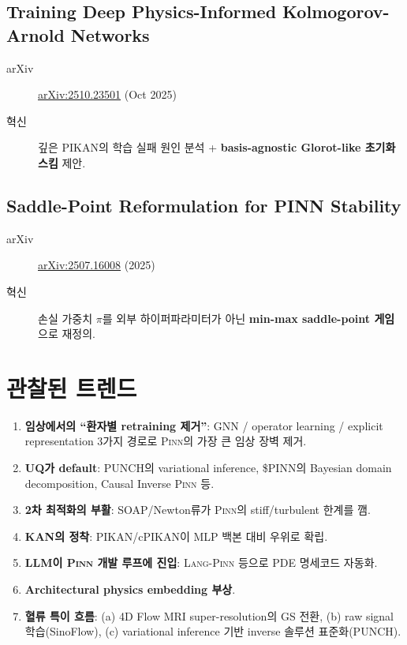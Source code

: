 \documentclass[11pt,a4paper,oneside]{report}
\newcommand{\pinn}{\textsc{Pinn}}
\newcommand{\langpinn}{\textsc{Lang-Pinn}}
\newcommand{\arxivid}[1]{\href{https://arxiv.org/abs/#1}{arXiv:#1}}
\begin{document}
\subsection{Training Deep Physics-Informed Kolmogorov-Arnold Networks}

\begin{description}
\item[arXiv] \arxivid{2510.23501} (Oct 2025)
\item[혁신] 깊은 PIKAN의 학습 실패 원인 분석 + \textbf{basis-agnostic Glorot-like 초기화 스킴} 제안.
\end{description}

\subsection{Saddle-Point Reformulation for PINN Stability}

\begin{description}
\item[arXiv] \arxivid{2507.16008} (2025)
\item[혁신] 손실 가중치 $\pi$를 외부 하이퍼파라미터가 아닌 \textbf{min-max saddle-point 게임}으로 재정의.
\end{description}

\section{관찰된 트렌드}

\begin{enumerate}
\item \textbf{임상에서의 ``환자별 retraining 제거''}: GNN / operator learning / explicit representation 3가지 경로로 \pinn{}의 가장 큰 임상 장벽 제거.
\item \textbf{UQ가 default}: PUNCH의 variational inference, \$PINN의 Bayesian domain decomposition, Causal Inverse \pinn{} 등.
\item \textbf{2차 최적화의 부활}: SOAP/Newton류가 \pinn{}의 stiff/turbulent 한계를 깸.
\item \textbf{KAN의 정착}: PIKAN/cPIKAN이 MLP 백본 대비 우위로 확립.
\item \textbf{LLM이 \pinn{} 개발 루프에 진입}: \langpinn{} 등으로 PDE 명세\textrightarrow{}코드 자동화.
\item \textbf{Architectural physics embedding 부상}.
\item \textbf{혈류 특이 흐름}: (a) 4D Flow MRI super-resolution의 GS 전환, (b) raw signal 학습(SinoFlow), (c) variational inference 기반 inverse 솔루션 표준화(PUNCH).
\end{enumerate}
\end{document}
